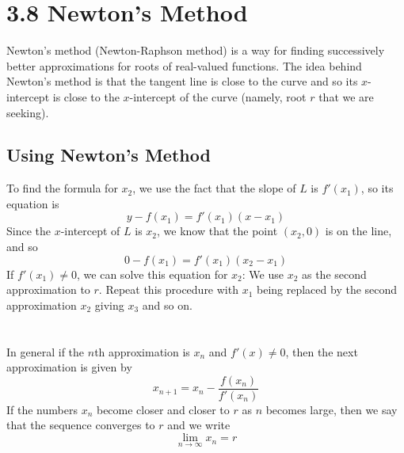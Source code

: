 %
%

\section*{3.8 Newton's Method}

Newton's method (Newton-Raphson method) is a way for finding successively better approximations for roots of real-valued functions. The idea behind Newton's method is that the tangent line is close to the curve and so its \(x\)-intercept is close to the \(x\)-intercept of the curve (namely, root \(r\) that we are seeking).

\subsection*{Using Newton's Method}

To find the formula for \(x_2\), we use the fact that the slope of \(L\) is \(f'(x_1)\), so its equation is 
$$ y-f(x_1)=f'(x_1)(x-x_1) $$
Since the \(x\)-intercept of \(L\) is \(x_2\), we know that the point \((x_2, 0)\) is on the line, and so 
$$ 0-f(x_1)=f'(x_1)(x_2-x_1) $$
If \(f'(x_1) \neq 0\), we can solve this equation for \(x_2\):
We use \(x_2\) as the second approximation to \(r\).
Repeat this procedure with \(x_1\) being replaced by the second approximation \(x_2\) giving \(x_3\) and so on.
\\\\\\
In general if the \(n\)th approximation is \(x_n\) and \(f'(x) \neq 0\), then the next approximation is given by
$$ x_{n+1}=x_n-\frac{f(x_n)}{f'(x_n)} $$
If the numbers \(x_n\) become closer and closer to \(r\) as \(n\) becomes large, then we say that the sequence converges to \(r\) and we write 
$$ \lim_{n \to \infty}x_n=r $$

